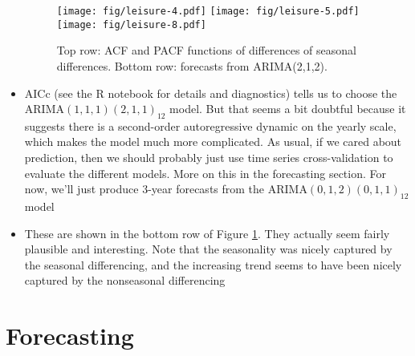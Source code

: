 \documentclass{article}
\begin{document}
\begin{itemize}
\begin{figure}[htb]
\centering
\texttt{[image: fig/leisure-4.pdf]}
\texttt{[image: fig/leisure-5.pdf]}
\texttt{[image: fig/leisure-8.pdf]}
\caption{Top row: ACF and PACF functions of differences of seasonal
  differences. Bottom row: forecasts from ARIMA(2,1,2).}
\label{fig:leisure_forecast}
\end{figure} 

\item AICc (see the R notebook for details and diagnostics)
  tells us to choose the ARIMA$(1,1,1)(2,1,1)_{12}$ model. But that seems a bit 
  doubtful because it suggests there is a second-order autoregressive dynamic 
  on the yearly scale, which makes the model much more complicated. As usual,
  if we cared about prediction, then we should probably just use time series
  cross-validation to evaluate the different models. More on this in the
  forecasting section. For now, we'll just produce 3-year forecasts from the 
  ARIMA$(0,1,2)(0,1,1)_{12}$ model

\item These are shown in the bottom row of Figure
  \ref{fig:leisure_forecast}. They actually seem fairly plausible and
  interesting. Note that the seasonality was nicely captured by the seasonal
  differencing, and the increasing trend seems to have been nicely captured by
  the nonseasonal differencing 
\end{itemize}

\section{Forecasting}
\end{document}
